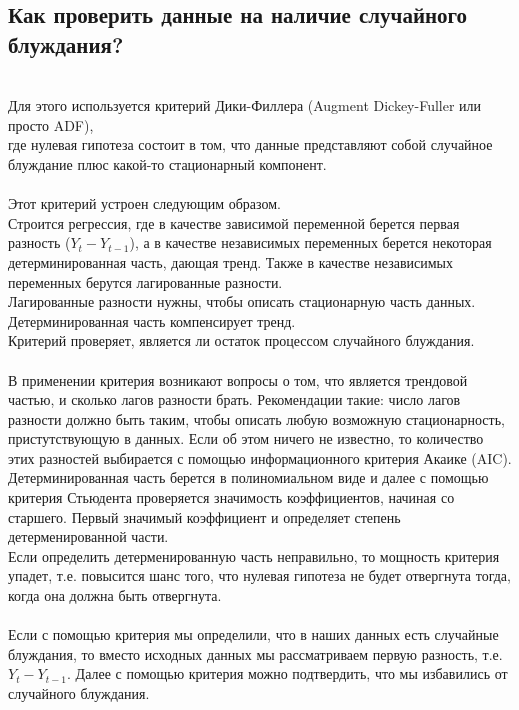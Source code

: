 \documentclass{article}
\begin{document}
\begin{itemize}
    \subsection{Как проверить данные на наличие случайного блуждания?}
    \\ Для этого используется критерий Дики-Филлера (Augment Dickey-Fuller или просто ADF),
    \\где нулевая гипотеза состоит в том, что данные представляют собой случайное блуждание плюс какой-то стационарный компонент.
    \\
    \\ Этот критерий устроен следующим образом. 
    \\ Строится регрессия, где в качестве зависимой переменной берется первая разность ($Y_t - Y_{t-1}$), а в качестве независимых переменных берется некоторая детерминированная часть, дающая тренд. Также в качестве независимых переменных берутся лагированные разности.
    \\ Лагированные разности нужны, чтобы описать стационарную часть данных.
    \\ Детерминированная часть компенсирует тренд. 
    \\ Критерий проверяет, является ли остаток процессом случайного блуждания.
    \\
    \\ В применении критерия возникают вопросы о том, что является трендовой частью, и сколько лагов разности брать. Рекомендации такие: число лагов разности должно быть таким, чтобы описать любую возможную стационарность, пристутствующую в данных. Если об этом ничего не известно, то количество этих разностей выбирается с помощью информационного критерия Акаике (AIC).
    \\ Детерминированная часть берется в полиномиальном виде и далее с помощью критерия Стьюдента проверяется значимость коэффициентов, начиная со старшего. Первый значимый коэффициент и определяет степень детерменированной части. 
    \\Если определить детерменированную часть неправильно, то мощность критерия упадет, т.е. повысится шанс того, что нулевая гипотеза не будет отвергнута тогда, когда она должна быть отвергнута.
    \\
    \\ Если с помощью критерия мы определили, что в наших данных есть случайные блуждания, то вместо исходных данных мы рассматриваем первую разность, т.е. $Y_t - Y_{t-1}$. Далее с помощью критерия можно подтвердить, что мы избавились от случайного блуждания.

\end{itemize}
\end{document}
